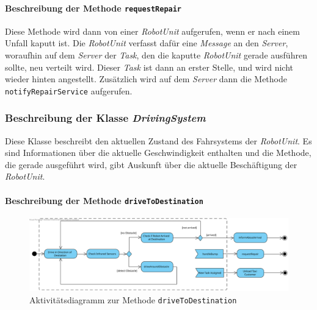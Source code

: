 			\paragraph{Beschreibung der Methode \texttt{requestRepair}}
			Diese Methode wird dann von einer \textit{RobotUnit} aufgerufen, wenn er nach einem Unfall kaputt ist. Die \textit{RobotUnit} verfasst dafür eine \textit{Message} an den \textit{Server}, woraufhin auf dem \textit{Server} der \textit{Task}, den die kaputte \textit{RobotUnit} gerade ausführen sollte, neu verteilt wird. Dieser \textit{Task} ist dann an erster Stelle, und wird nicht wieder hinten angestellt. Zusätzlich wird auf dem \textit{Server} dann die Methode \texttt{notifyRepairService} aufgerufen.		
			
	\subsubsection{Beschreibung der Klasse \textit{DrivingSystem}}
		
		Diese Klasse beschreibt den aktuellen Zustand des Fahrsystems der \textit{RobotUnit}. 
		Es sind Informationen über die aktuelle Geschwindigkeit enthalten und die Methode, 
		die gerade ausgeführt wird, gibt Auskunft über die aktuelle Beschäftigung der \textit{RobotUnit}.

			\paragraph{Beschreibung der Methode \texttt{driveToDestination}}
			\begin{figure}[H]
			\centering
			\includegraphics[width=1\textwidth]{img/7-1-methode_driveToDestination}
			\caption{Aktivitätsdiagramm zur Methode \texttt{driveToDestination}}
			\label{AktivitaetDriveToDestination}
			\end{figure}

